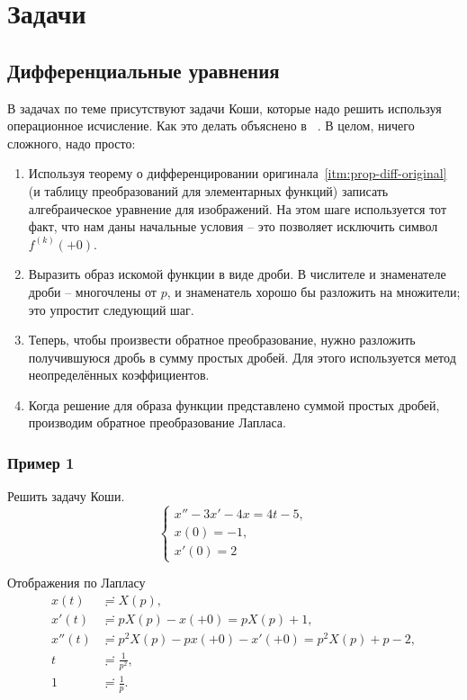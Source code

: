 \documentclass[12pt]{report}
\begin{document}
\section{Задачи}
\subsection{Дифференциальные уравнения}
В задачах по теме присутствуют задачи Коши, которые надо решить используя операционное исчисление. Как это делать объяснено в ~\cite{difur}. В целом, ничего сложного, надо просто: 
\begin{enumerate}
	\item Используя теорему о дифференцировании оригинала~\ref{itm:prop-diff-original} (и таблицу преобразований для элементарных функций) записать алгебраическое уравнение для изображений. На этом шаге используется тот факт, что нам даны начальные условия -- это позволяет исключить символ $f^{(k)}(+0)$.
	\item Выразить образ искомой функции в виде дроби. В числителе и знаменателе дроби -- многочлены от $p$, и знаменатель хорошо бы разложить на множители; это упростит следующий шаг.
	\item Теперь,  чтобы произвести обратное преобразование, нужно разложить получившуюся дробь в сумму простых дробей. Для этого используется метод неопределённых коэффициентов.~\cite{indefinite-coef-method}
	\item Когда решение для образа функции представлено суммой простых дробей, производим обратное преобразование Лапласа. 
\end{enumerate}

\subsubsection{Пример 1~\cite{difur}} Решить задачу Коши.
\[
\begin{cases}
x'' - 3x' - 4x = 4t - 5, \\
x(0) = -1, \\
x'(0) = 2
\end{cases}
\]

Отображения по Лапласу
\begin{align*}
	x(t) &\risingdotseq X(p), \\
	x'(t) &\risingdotseq pX(p) - x(+0) = pX(p) + 1, \\
	x''(t) &\risingdotseq p^2X(p) - px(+0) - x'(+0) = p^2X(p) + p - 2, \\
	t &\risingdotseq \frac{1}{p^2}, \\
	1 &\risingdotseq \frac1p.
\end{align*}
\end{document}
